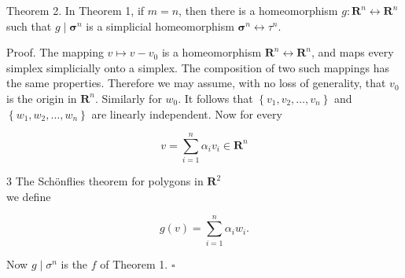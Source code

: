 Theorem 2. In Theorem 1, if $m=n$, then there is a homeomorphism $g: \mathbf{R}^{n} \leftrightarrow \mathbf{R}^{n}$ such that $g \mid \boldsymbol{\sigma}^{n}$ is a simplicial homeomorphism $\boldsymbol{\sigma}^{n} \leftrightarrow \tau^{n}$.

Proof. The mapping $v \mapsto v-v_{0}$ is a homeomorphism $\mathbf{R}^{n} \leftrightarrow \mathbf{R}^{n}$, and maps every simplex simplicially onto a simplex. The composition of two such mappings has the same properties. Therefore we may assume, with no loss of generality, that $v_{0}$ is the origin in $\mathbf{R}^{n}$. Similarly for $w_{0}$. It follows that $\left\{v_{1}, v_{2}, \ldots, v_{n}\right\}$ and $\left\{w_{1}, w_{2}, \ldots, w_{n}\right\}$ are linearly independent. Now for every

$$
v=\sum_{i=1}^{n} \alpha_{i} v_{i} \in \mathbf{R}^{n}
$$

3 The Schönflies theorem for polygons in $\mathbf{R}^{2}$\\
we define

$$
g(v)=\sum_{i=1}^{n} \alpha_{i} w_{i} .
$$

Now $g \mid \sigma^{n}$ is the $f$ of Theorem 1. \(\square\)
